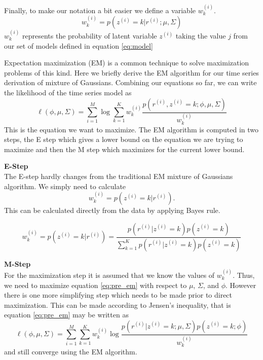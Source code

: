 Finally, to make our notation a bit easier we define a variable $w^{(i)}_{k}$.  
\begin{equation}
w_{k}^{(i)} = p(z^{(i)} = k|r^{(i)};\mu, \Sigma)
\end{equation}
\noindent
$w_{k}^{(i)}$ represents the probability of latent variable $z^{(i)}$ taking the value $j$ from our set of models defined in equation \ref{eq:model}

Expectation maximization (EM) is a common technique to solve maximization problems of this kind.  Here we briefly derive the EM algorithm for our time series derivation of mixture of Gaussians.  Combining our equations so far, we can write the likelihood of the time series model as
\begin{equation}
\label{eq:pre_em}
\ell(\phi, \mu, \Sigma) = \sum_{i = 1}^{M}\log \sum_{k = 1}^{K}w_{k}^{(i)}\frac{p(r^{(i)}, z^{(i)}=k;\phi, \mu, \Sigma)}{w_{k}^{(i)}}
\end{equation}
\noindent
This is the equation we want to maximize.  The EM algorithm is computed in two steps, the E step which gives a lower bound on the equation we are trying to maximize and then the M step which maximizes for the current lower bound.  

\bigskip
\noindent
\textbf{E-Step} \\
The E-step hardly changes from the traditional EM mixture of Gaussians algorithm.  We simply need to calculate 
\begin{equation}
w^{(i)}_{k} = p(z^{(i)} = k|r^{(i)}).
\end{equation}
\noindent
This can be calculated directly from the data by applying Bayes rule.

\begin{equation}
w^{(i)}_{k} = p(z^{(i)} = k|r^{(i)}) = \frac{p(r^{(i)}|z^{(i)}=k)p(z^{(i)}=k)}
						{\sum_{k=1}^{K}p(r^{(i)}|z^{(i)}=k)p(z^{(i)}=k)}
\end{equation}


\bigskip
\noindent
\textbf{M-Step} \\
For the maximization step it is assumed that we know the values of $w_{k}^{(i)}$.  Thus, we need to maximize equation \ref{eq:pre_em} with respect to $\mu$, $\Sigma$, and $\phi$.  However there is one more simplifying step which needs to be made prior to direct maximization.  This can be made according to Jensen's inequality, that is equation \ref{eq:pre_em} may be written as 
\begin{equation}
\label{eq:em_likelihood}
\ell(\phi, \mu, \Sigma) = \sum_{i = 1}^{M}\sum_{k = 1}^{K}w_{k}^{(i)}\log \frac{p(r^{(i)}|z^{(i)}=k;\mu, \Sigma)p(z^{(i)} = k;\phi)}{w_{k}^{(i)}}
\end{equation}
and still converge using the EM algorithm.

